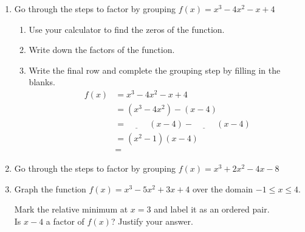 \documentclass[12pt, twoside]{article}
\begin{document}
\begin{enumerate}[itemsep=0.5cm]
\newpage 
\item Go through the steps to factor by grouping $f(x) = x^3-4x^2-x+4$
\begin{enumerate}[itemsep=1cm]
    \item Use your calculator to find the zeros of the function.
    \item Write down the factors of the function.
    \item Write the final row and complete the grouping step by filling in the blanks.
    \begin{align*}
        f(x) &= x^3-4x^2-x+4 \\[0.5cm]
             &= (x^3-4x^2)-(x-4) \\[0.5cm]
             &= \underline{\hspace{1cm}}\;(x-4) - \underline{\hspace{1cm}}\;(x-4) \\[0.5cm]
             &= (x^2-1)(x-4) \\[0.5cm]
             &=
        \end{align*}
\end{enumerate}

\item Go through the steps to factor by grouping $f(x) = x^3+2x^2-4x-8$

\newpage
\item Graph the function $f(x) = x^{3}-5x^{2}+3x+4$ over the domain $-1 \leq x \leq 4$. 
\begin{center}
    \end{center}
Mark the relative minimum at $x=3$ and label it as an ordered pair. \\[1cm]
Is $x-4$ a factor of $f(x)$? Justify your answer.

\end{enumerate}
\end{document}
